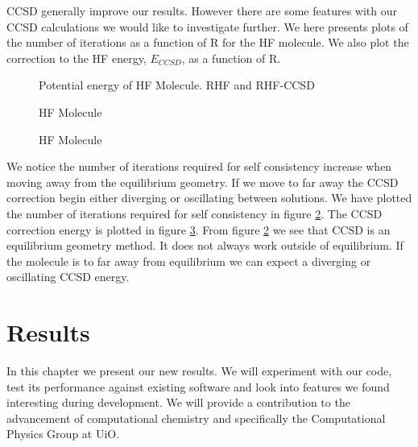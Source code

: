 \documentclass[a4paper,norsk,11pt,twoside]{report}
\begin{document}
CCSD generally improve our results. However there are some features with our CCSD calculations we would like to investigate further. We here presents plots of the number of iterations as a function of R for the HF molecule. We also plot the correction to the HF energy, $E_{CCSD}$, as a function of R. \\ 


\begin{figure}[h!]
\begin{center}
\caption{Potential energy of HF Molecule. RHF and RHF-CCSD}
\label{fig:hfpoten}
\end{center}
\end{figure}

\newpage

\begin{figure}[h!]
\begin{center}
\caption{HF Molecule}
\label{fig:hfiter}
\end{center}
\end{figure}

\begin{figure}[h!]
\begin{center}
\caption{HF Molecule}
\label{fig:hfcorr}
\end{center}
\end{figure}

We notice the number of iterations required for self consistency increase when moving away from the equilibrium geometry. If we move to far away the CCSD correction begin either diverging or oscillating between solutions. We have plotted the number of iterations required for self consistency in figure \ref{fig:hfiter}. The CCSD correction energy is plotted in figure \ref{fig:hfcorr}. From figure \ref{fig:hfiter} we see that CCSD is an equilibrium geometry method. It does not always work outside of equilibrium. If the molecule is to far away from equilibrium we can expect a diverging or oscillating CCSD energy. 

\chapter{Results}
In this chapter we present our new results. We will experiment with our code, test its performance against existing software and look into features we found interesting during development. We will provide a contribution to the advancement of computational chemistry and specifically the Computational Physics Group at UiO. 
\end{document}
